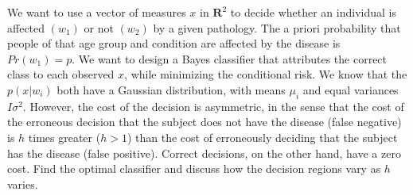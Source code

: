 \Exercise[number={7}]
We want to use a vector of measures \(x\) in \(\mathbf{R}^2\) to decide whether
an individual is affected \((w_1)\) or not \((w_2)\) by a given pathology.
The a priori probability that people of that age group and condition are
affected by the disease is \(Pr(w_1)=p\). We want to design a Bayes classifier
that attributes the correct class to each observed \(x\), while minimizing the
conditional risk. We know that the \(p(x|w_i)\) both have a Gaussian
distribution, with means \(\mu_i\) and equal variances \(I\sigma^2\).
However, the cost of the decision is asymmetric, in the sense that the cost of
the erroneous decision that the subject does not have the disease (false
negative) is \(h\) times greater (\(h>1\)) than the cost of erroneously
deciding that the subject has the disease (false positive). Correct decisions,
on the other hand, have a zero cost. Find the optimal classifier and discuss
how the decision regions vary as \(h\) varies.

